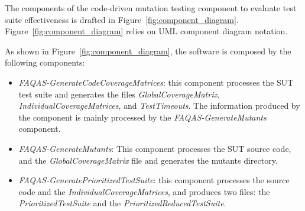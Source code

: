 The components of the code-driven mutation testing component to evaluate test suite effectiveness is drafted in Figure~\ref{fig:component_diagram}. Figure~\ref{fig:component_diagram} relies on UML component diagram notation.

As shown in Figure~\ref{fig:component_diagram}, the software is composed by the following components:

\begin{itemize}
	\item \textit{FAQAS-GenerateCodeCoverageMatrices}: this component processes the SUT test suite and generates the files \textit{GlobalCoverageMatrix}, \textit{IndividualCoverageMatrices}, and \textit{TestTimeouts}. The information produced by the component is mainly processed by the \textit{FAQAS-GenerateMutants} component.

	\item \textit{FAQAS-GenerateMutants}: This component processes the SUT source code, and the \textit{GlobalCoverageMatrix} file and generates the mutants directory.

	\item \textit{FAQAS-GeneratePrioritizedTestSuite}: this component processes the source code and the \textit{IndividualCoverageMatrices}, and produces two files: the \textit{PrioritizedTestSuite} and the \textit{PrioritizedReducedTestSuite}.


\end{itemize}
